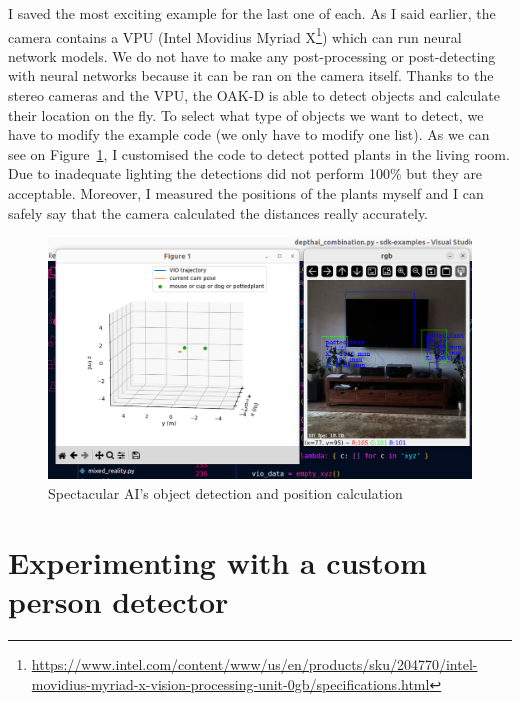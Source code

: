 I saved the most exciting example for the last one of each. As I said earlier, the camera contains a VPU (Intel Movidius Myriad X\footnote{\url{https://www.intel.com/content/www/us/en/products/sku/204770/intel-movidius-myriad-x-vision-processing-unit-0gb/specifications.html}}) which can run neural network models. We do not have to make any post-processing or post-detecting with neural networks because it can be ran on the camera itself. Thanks to the stereo cameras and the VPU, the OAK-D is able to detect objects and calculate their location on the fly. To select what type of objects we want to detect, we have to modify the example code (we only have to modify one list). As we can see on Figure~\ref{fig:SPAI_depthai}, I customised the code to detect potted plants in the living room. Due to inadequate lighting the detections did not perform 100\% but they are acceptable. Moreover, I measured the positions of the plants myself and I can safely say that the camera calculated the distances really accurately.

\begin{figure}[H]
	\centering
	\includegraphics[width=150mm, keepaspectratio]{figures/spectacular_ai_depthai_combination.png}
	\caption{Spectacular AI's object detection and position calculation}
	\label{fig:SPAI_depthai}
\end{figure}


\section{Experimenting with a custom person detector}

